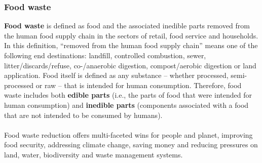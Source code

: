 \documentclass[../summary.tex]{subfiles}
\begin{document}
	\subsubsection{Food waste}
	
	 \textbf{Food waste} is defined as food and the associated inedible parts removed from the human food supply chain in the sectors of retail, food service and households. In this definition, “removed from the human food supply chain” means one of the following end destinations: landfill, controlled combustion, sewer, litter/discards/refuse, co-/anaerobic digestion, compost/aerobic digestion or land application. Food itself is defined as any substance – whether processed, semi-processed or raw – that is intended for human consumption. Therefore, food waste includes both \textbf{edible parts} (i.e., the parts of food that were intended for human consumption) and \textbf{inedible parts} (components associated with a food that are not intended to be consumed by humans).
	 \\\\
	 Food waste reduction offers multi-faceted wins for people and planet, improving food security, addressing climate change, saving money and reducing pressures on land, water, biodiversity and waste management systems. 
	 
\end{document}
